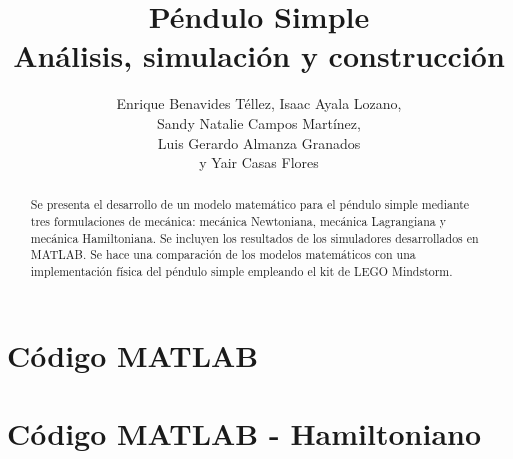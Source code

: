 \documentclass[letterpaper, 12pt]{article}
\begin{document}
\title{
Péndulo Simple\\
Análisis, simulación y construcción\\
}


\author{
    Enrique Benavides Téllez, Isaac Ayala Lozano,\\ 
    Sandy Natalie Campos Martínez,\\
    Luis Gerardo Almanza Granados\\
    y Yair Casas Flores
}

\date{}

\maketitle

\begin{abstract}



Se presenta el desarrollo de un modelo matemático
para el péndulo simple mediante tres formulaciones de mecánica: 
mecánica Newtoniana, mecánica Lagrangiana y mecánica Hamiltoniana.
Se incluyen los resultados de los simuladores desarrollados 
en MATLAB.
Se hace una comparación de los modelos matemáticos 
con una implementación física del péndulo simple empleando el 
kit de LEGO Mindstorm.

\end{abstract}








% 



\clearpage
% 
\printbibliography{}

\pagebreak

\appendix
\section{Código MATLAB}


\section{Código MATLAB - Hamiltoniano}


% 
\end{document}

